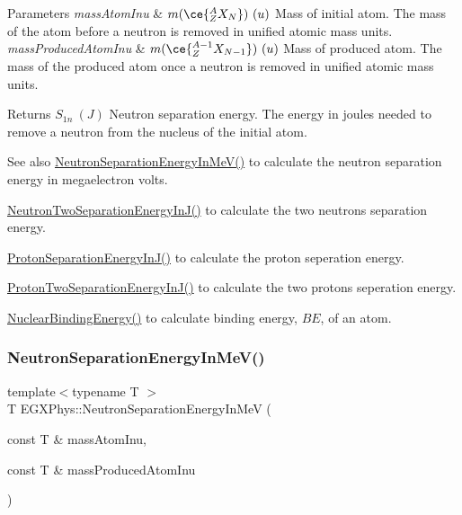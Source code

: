 \begin{DoxyParams}{Parameters}
{\em mass\+Atom\+Inu} & $m(\ce{ ^{A}_{Z}X_{N} })\ (u)$ Mass of initial atom. The mass of the atom before a neutron is removed in unified atomic mass units. \\
\hline
{\em mass\+Produced\+Atom\+Inu} & $m(\ce{ ^{A-1}_{Z}X_{N-1} })\ (u)$ Mass of produced atom. The mass of the produced atom once a neutron is removed in unified atomic mass units. \\
\hline
\end{DoxyParams}
\begin{DoxyReturn}{Returns}
$S_{1n}\ (J)$ Neutron separation energy. The energy in joules needed to remove a neutron from the nucleus of the initial atom. 
\end{DoxyReturn}
\begin{DoxySeeAlso}{See also}
\mbox{\hyperlink{group___nuclear_separation_energy_ga66133edb5809c81dd9fd60e09ebbef79}{Neutron\+Separation\+Energy\+In\+Me\+V()}} to calculate the neutron separation energy in megaelectron volts. 

\mbox{\hyperlink{group___nuclear_separation_energy_ga293ac9428420a0adf4235048dbe529b4}{Neutron\+Two\+Separation\+Energy\+In\+J()}} to calculate the two neutrons separation energy. 

\mbox{\hyperlink{group___nuclear_separation_energy_ga4274d8f5a3860169fd81970707eb582a}{Proton\+Separation\+Energy\+In\+J()}} to calculate the proton seperation energy. 

\mbox{\hyperlink{group___nuclear_separation_energy_gad7c1d4a32daa8aaa53c5fce37c421f82}{Proton\+Two\+Separation\+Energy\+In\+J()}} to calculate the two protons seperation energy. 

\mbox{\hyperlink{group___nuclear_binding_energy_gafea41a3c21704414394c3204b35aba98}{Nuclear\+Binding\+Energy()}} to calculate binding energy, $BE$, of an atom. 
\end{DoxySeeAlso}
\mbox{\label{group___nuclear_separation_energy_ga66133edb5809c81dd9fd60e09ebbef79}} 
\subsubsection{\texorpdfstring{Neutron\+Separation\+Energy\+In\+Me\+V()}{NeutronSeparationEnergyInMeV()}}
{\footnotesize\ttfamily template$<$typename T $>$ \\
T E\+G\+X\+Phys\+::\+Neutron\+Separation\+Energy\+In\+MeV (\begin{DoxyParamCaption}\item[{const T \&}]{mass\+Atom\+Inu,  }\item[{const T \&}]{mass\+Produced\+Atom\+Inu }\end{DoxyParamCaption})}



